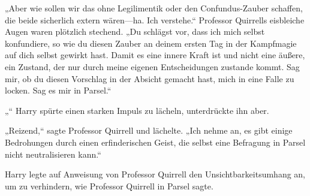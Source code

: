 „Aber wie sollen wir das ohne Legilimentik oder den Confundus-Zauber schaffen, die beide sicherlich extern wären—ha. Ich verstehe.“
Professor Quirrells eisbleiche Augen waren plötzlich stechend.
„Du schlägst vor, dass ich mich selbst konfundiere, so wie du diesen Zauber an deinem ersten Tag in der Kampfmagie auf dich selbst gewirkt hast. Damit es eine innere Kraft ist und nicht eine äußere, ein Zustand, der nur durch meine eigenen Entscheidungen zustande kommt. Sag mir, ob du diesen Vorschlag in der Absicht gemacht hast, mich in eine Falle zu locken. Sag es mir in Parsel.“

„“
Harry spürte einen starken Impuls zu lächeln, unterdrückte ihn aber.

„Reizend,“ sagte Professor Quirrell und lächelte.
„Ich nehme an, es gibt einige Bedrohungen durch einen erfinderischen Geist, die selbst eine Befragung in Parsel nicht neutralisieren kann.“

\later

Harry legte auf Anweisung von Professor Quirrell den Unsichtbarkeitsumhang an, um zu verhindern,  wie Professor Quirrell in Parsel sagte.

